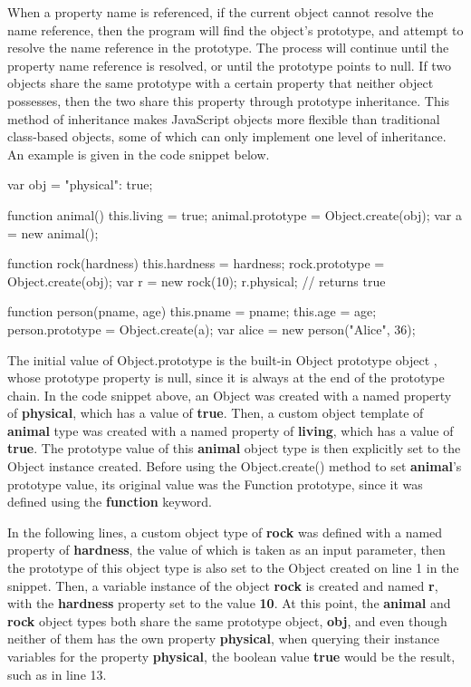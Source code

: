 \documentclass[a4paper,11pt,twoside]{report}
\begin{document}
When a property name is referenced, if the current object cannot resolve the name reference, then the program will find the object's prototype, and attempt to resolve the name reference in the prototype. The process will continue until the property name reference is resolved, or until the prototype points to null. If two objects share the same prototype with a certain property that neither object possesses, then the two share this property through prototype inheritance. This method of inheritance makes JavaScript objects more flexible than traditional class-based objects, some of which can only implement one level of inheritance. An example is given in the code snippet below.
\begin{adjustwidth}{4cm}{4cm}
\begin{lstjs}
var obj = {"physical": true};

function animal() {
	this.living = true;
}
animal.prototype = Object.create(obj);
var a = new animal();

function rock(hardness) {
	this.hardness = hardness;
}
rock.prototype = Object.create(obj);
var r = new rock(10);
r.physical; // returns true

function person(pname, age) {
	this.pname = pname;
	this.age = age;
}
person.prototype = Object.create(a);
var alice = new person("Alice", 36);

\end{lstjs}
\end{adjustwidth}

The initial value of Object.prototype is the built-in Object prototype object \cite{EcmaScript}, whose prototype property is null, since it is always at the end of the prototype chain. In the code snippet above, an Object was created with a named property of \textbf{physical}, which has a value of \textbf{true}. Then, a custom object template of \textbf{animal} type was created with a named property of \textbf{living}, which has a value of \textbf{true}. The prototype value of this \textbf{animal} object type is then explicitly set to the Object instance created. Before using the Object.create() method to set \textbf{animal}'s prototype value, its original value was the Function prototype, since it was defined using the \textbf{function} keyword. 

In the following lines, a custom object type of \textbf{rock} was defined with a named property of \textbf{hardness}, the value of which is taken as an input parameter, then the prototype of this object type is also set to the Object created on line 1 in the snippet. Then, a variable instance of the object \textbf{rock} is created and named \textbf{r}, with the \textbf{hardness} property set to the value \textbf{10}. At this point, the \textbf{animal} and \textbf{rock} object types both share the same prototype object, \textbf{obj}, and even though neither of them has the own property \textbf{physical}, when querying their instance variables for the property \textbf{physical}, the boolean value \textbf{true} would be the result, such as in line 13. 
\end{document}
